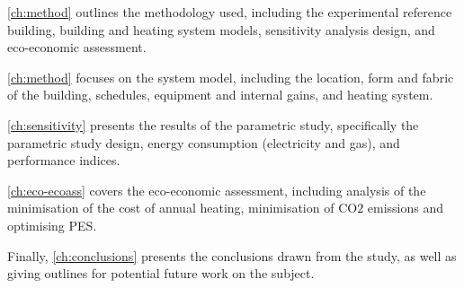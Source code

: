 \cref{ch:method} outlines the methodology used, including the experimental reference building, building and heating system models, sensitivity analysis design, and eco-economic assessment. 

\cref{ch:method} focuses on the system model, including the location, form and fabric of the building, schedules, equipment and internal gains, and heating system. 

\cref{ch:sensitivity} presents the results of the parametric study, specifically the parametric study design, energy consumption (electricity and gas), and performance indices. 

\cref{ch:eco-ecoass} covers the eco-economic assessment, including analysis of the minimisation of the cost of annual heating, minimisation of $\text{CO}2$ emissions and optimising \ac{PES}.

Finally, \cref{ch:conclusions} presents the conclusions drawn from the study, as well as giving outlines for potential future work on the subject.
